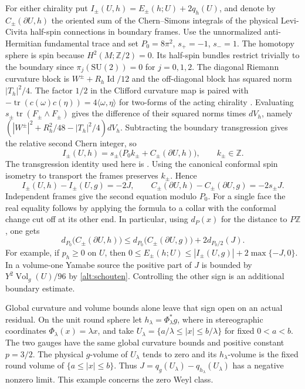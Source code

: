 For either chirality put
\(I_\pm(U,h)=E_\pm(h;U)+2q_h(U)\), and denote by
\(C_\pm(\partial U,h)\) the oriented sum of the Chern--Simons
integrals of the physical Levi-Civita half-spin connections in
boundary frames. Use the unnormalized anti-Hermitian fundamental
trace and set \(P_0=8\pi^2\), \(s_+=-1\), \(s_-=1\).
The homotopy sphere is spin because \(H^2(M;\mathbb Z/2)=0\).
Its half-spin bundles restrict trivially to the boundary
since \(\pi_j(\mathrm{SU}(2))=0\) for \(j=0,1,2\).
The diagonal Riemann curvature block is
\(W^\pm+R_h\operatorname{Id}/12\) and the off-diagonal block
has squared norm \(|T_h|^2/4\). The factor \(1/2\) in the
Clifford curvature map is paired with
\(-\operatorname{tr}(c(\omega)c(\eta))=4\langle\omega,\eta\rangle\)
for two-forms of the acting chirality
\cite[\S2.3]{Baker2026DiracYamabe}. Evaluating
\(s_\pm\operatorname{tr}(F_\pm\wedge F_\pm)\) gives the difference
of their squared norms times \(dV_h\), namely
\((|W^\pm|^2+R_h^2/48-|T_h|^2/4)dV_h\).
Subtracting the boundary transgression gives the relative second
Chern integer, so
\[
 I_\pm(U,h)=s_\pm\bigl(P_0k_\pm+C_\pm(\partial U,h)\bigr),
 \qquad k_\pm\in\mathbb Z .
\]
The transgression identity used here is
\cite[\S3, Proposition 3.2]{ChernSimons1974Characteristic}.
Using the canonical conformal spin isometry to transport the frames
preserves \(k_\pm\). Hence
\begin{equation}\label{alt:gauge-charge}
 I_\pm(U,h)-I_\pm(U,g)=-2J,\qquad
 C_\pm(\partial U,h)-C_\pm(\partial U,g)=-2s_\pm J .
\end{equation}
Independent frames give the second equation modulo \(P_0\).
For a single face the real equality follows by applying the
formula to a collar with the conformal change cut off at its
other end. In particular, using \(d_P(x)\) for the distance
to \(P\mathbb Z\), one gets
\[
 d_{P_0}\bigl(C_\pm(\partial U,h)\bigr)
 \le d_{P_0}\bigl(C_\pm(\partial U,g)\bigr)+2d_{P_0/2}(J).
\]
For example, if \(p_h\ge0\) on \(U\), then
\(0\le E_\pm(h;U)\le |I_\pm(U,g)|+2\max\{-J,0\}\).
In a volume-one Yamabe source the positive part of \(J\) is
bounded by \(Y^2\operatorname{Vol}_g(U)/96\) by \eqref{alt:schouten}.
Controlling the other sign is an additional boundary estimate.

Global curvature and volume bounds alone leave that sign open
on an actual residual. On the unit round sphere let
\(h_\lambda=\Phi_\lambda^*g\), where in stereographic coordinates
\(\Phi_\lambda(x)=\lambda x\), and take
\(U_\lambda=\{a/\lambda\le |x|\le b/\lambda\}\) for fixed
\(0<a<b\). The two gauges have the same global curvature bounds
and positive constant \(p=3/2\). The physical \(g\)-volume of
\(U_\lambda\) tends to zero and its \(h_\lambda\)-volume is the
fixed round volume of \(\{a\le |x|\le b\}\). Thus
\(J=q_g(U_\lambda)-q_{h_\lambda}(U_\lambda)\) has a negative
nonzero limit. This example concerns the zero Weyl class.

